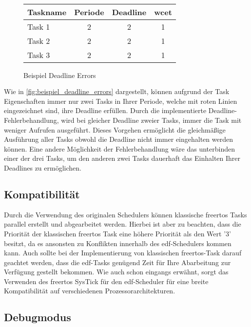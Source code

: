 \documentclass[../EDF Master Thesis.tex]{subfiles}
\begin{document}
\begin{figure}[H]
\begin{tikzpicture}
        \end{tikzpicture}\\
        \vspace {1cm}
        \begin{tabular}{l|c|c|c}
            Taskname & Periode & Deadline & \ac{wcet} \\
            \hline
            Task 1 & 2 & 2 & 1 \\
            Task 2 & 2 & 2 & 1 \\
            Task 3 & 2 & 2 & 1 
        \end{tabular}
        \caption{Beispiel Deadline Errors}
        \label{fig:beispiel_deadline_errors}
    \end{figure}

    Wie in \autoref{fig:beispiel_deadline_errors} dargestellt, können aufgrund der Task Eigenschaften immer nur zwei Tasks in Ihrer Periode, welche mit roten Linien eingezeichnet sind, ihre Deadline erfüllen.
    Durch die implementierte Deadline-Fehlerbehandlung, wird bei gleicher Deadline zweier Tasks, immer die Task mit weniger Aufrufen ausgeführt.
    Dieses Vorgehen ermöglicht die gleichmäßige Ausführung aller Tasks obwohl die Deadline nicht immer eingehalten werden können.
    Eine andere Möglichkeit der Fehlerbehandlung wäre das unterbinden einer der drei Tasks, um den anderen zwei Tasks dauerhaft das Einhalten Ihrer Deadlines zu ermöglichen.

\subsection{Kompatibilität}

    Durch die Verwendung des originalen Schedulers können klassische \ac{freertos} Tasks parallel erstellt und abgearbeitet werden.
    Hierbei ist aber zu beachten, dass die Priorität der klassischen \ac{freertos} Task eine höhere Priorität als den Wert '3' besitzt, da es ansonsten zu Konflikten innerhalb des \ac{edf}-Schedulers kommen kann.
    Auch sollte bei der Implementierung von klassischen \ac{freertos}-Task darauf geachtet werden, dass die \ac{edf}-Tasks genügend Zeit für Ihre Abarbeitung zur Verfügung gestellt bekommen.
    Wie auch schon eingangs erwähnt, sorgt das Verwenden des \ac{freertos} SysTick für den \ac{edf}-Scheduler für eine breite Kompatibilität auf verschiedenen Prozessorarchitekturen.

\subsection{Debugmodus} \label{section:debug_mode}
\end{document}
